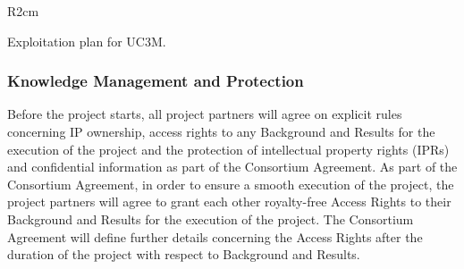 \documentclass[a4paper,11pt]{article}
\begin{document}
\begin{wrapfigure}{R}{2cm}
\vspace{-1.4cm}
\hfill {}
\vspace{-0.9cm}
\end{wrapfigure}

Exploitation plan for UC3M.



\subsubsection{Knowledge Management and Protection}
\vspace{-12pt}


Before the project starts, all project partners will agree on explicit rules concerning IP ownership, access rights to any
Background and Results for the execution of the project and the
protection of intellectual property rights (IPRs) and confidential
information as part of the Consortium Agreement.
As part of the Consortium Agreement, in order to ensure a smooth
execution of the project, the project partners will agree to grant each other
royalty-free Access Rights to their Background and Results for the
execution of the project. The Consortium Agreement will define further
details concerning the Access Rights after the duration of the project 
with respect to Background and Results.
\end{document}
